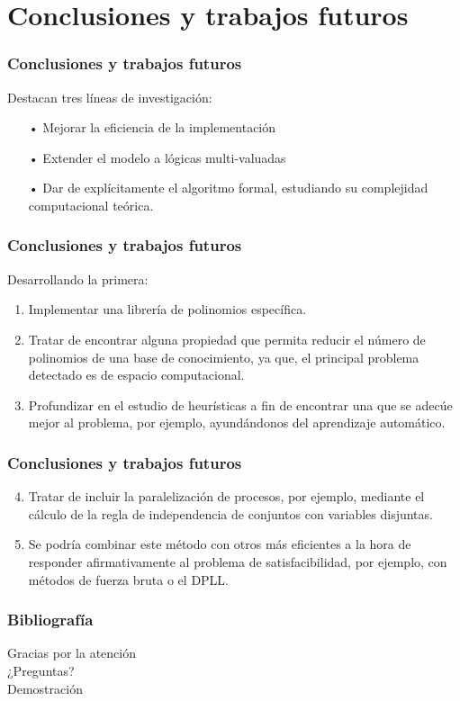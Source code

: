 \documentclass[12pt,a4paper]{beamer}
\theoremstyle{definition}
\theoremstyle{remark}
\begin{document}
\section{Conclusiones y trabajos futuros}
\begin{frame}
\frametitle{Conclusiones y trabajos futuros}
Destacan tres líneas de investigación:
\begin{itemize}
\item[•] Mejorar la eficiencia de la implementación
\item[•] Extender el modelo a lógicas multi-valuadas
\item[•] Dar de explícitamente el algoritmo formal, estudiando su complejidad computacional teórica.
\end{itemize}
\end{frame}

\begin{frame}
\frametitle{Conclusiones y trabajos futuros}
Desarrollando la primera:
\begin{enumerate}
\item Implementar una librería de polinomios específica.
\item Tratar de encontrar alguna propiedad que permita reducir el número de polinomios de una base de conocimiento, ya que, el principal problema detectado es de espacio computacional.
\item Profundizar en el estudio de heurísticas a fin de encontrar una que se adecúe mejor al problema, por ejemplo, ayundándonos del aprendizaje automático.
\end{enumerate}
\end{frame}
\begin{frame}
\frametitle{Conclusiones y trabajos futuros}
\begin{enumerate}
\setcounter{enumi}{3}
\item Tratar de incluir la paralelización de procesos, por ejemplo, mediante el cálculo de la regla de independencia de conjuntos con variables disjuntas. 
\item Se podría combinar este método con otros más eficientes a la hora de responder afirmativamente al problema de satisfacibilidad, por ejemplo, con métodos de fuerza bruta o el DPLL.
\end{enumerate}
\end{frame}

\begin{frame}[allowframebreaks]
  \frametitle{Bibliografía}
  \nocite{formulasYpolinomios}\nocite{original}



\end{frame}

\begin{frame}
\centering
	\Huge{Gracias por la atención} \\
	\pause
	\vspace{0.5cm}
	\Huge{¿Preguntas?}\\
	\pause
	\vspace{0.5cm}
	\Huge{Demostración}

\end{frame}
\end{document}
